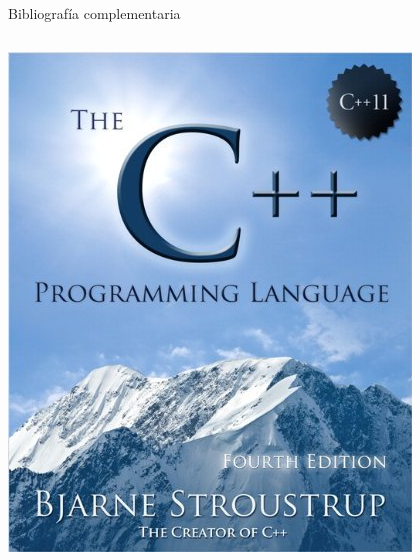 \begin{frame}[t]{Bibliografía complementaria}
\begin{columns}
\includegraphics[width=\linewidth]{images/cpp-pl4e.jpg}

\end{columns}

\vfill

\begin{columns}


\end{columns}
\end{frame}
